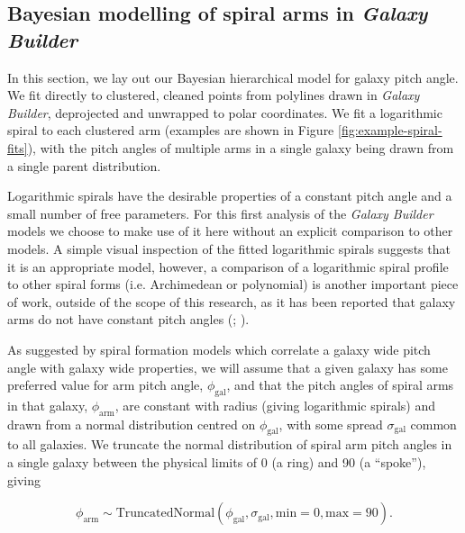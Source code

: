 \subsection{Bayesian modelling of spiral arms in \textit{Galaxy Builder}}
\label{section:bhsm-model}
In this section, we lay out our Bayesian hierarchical model for galaxy pitch angle. We fit directly to clustered, cleaned points from polylines drawn in \textit{Galaxy Builder}, deprojected and unwrapped to polar coordinates. We fit a logarithmic spiral to each clustered arm (examples are shown in Figure \ref{fig:example-spiral-fits}), with the pitch angles of multiple arms in a single galaxy being drawn from a single parent distribution.

Logarithmic spirals have the desirable properties of a constant pitch angle and a small number of free parameters. For this first analysis of the \textit{Galaxy Builder} models we choose to make use of it here without an explicit comparison to other models. A simple visual inspection of the fitted logarithmic spirals suggests that it is an appropriate model, however, a comparison of a logarithmic spiral profile to other spiral forms (i.e. Archimedean or polynomial) is another important piece of work, outside of the scope of this research, as it has been reported that galaxy arms do not have constant pitch angles (\citealt{1981AJ.....86.1847K}; \citealt{2009MNRAS.397..164R}).

As suggested by spiral formation models which correlate a galaxy wide pitch angle with galaxy wide properties, we will assume that a given galaxy has some preferred value for arm pitch angle, $\phi_\mathrm{gal}$, and that the pitch angles of spiral arms in that galaxy, $\phi_\mathrm{arm}$, are constant with radius (giving logarithmic spirals) and drawn from a normal distribution centred on $\phi_\mathrm{gal}$, with some spread $\sigma_\mathrm{gal}$ common to all galaxies. We truncate the normal distribution of spiral arm pitch angles in a single galaxy between the physical limits of {0\degree} (a ring) and {90\degree} (a ``spoke''), giving

\begin{equation}
\phi_\mathrm{arm} \sim \mathrm{TruncatedNormal}(\phi_\mathrm{gal}, \sigma_\mathrm{gal}, \mathrm{min}=0, \mathrm{max}=90).
\end{equation}


